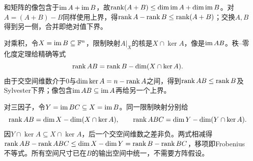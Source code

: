\label{der:8-1}
和矩阵的像包含于$\im A+\im B$，故$\rank(A+B)\le\dim\im A+\dim\im B$。对$A=(A+B)-B$同样使用上界，得$\rank A-\rank B\le\rank(A+B)$；交换$A,B$得到另一侧，合并即绝对值下界。

对乘积，令$X=\im B\subseteq\F^n$，限制映射$A|_X$的核是$X\cap\ker A$，像是$\im AB$。秩--零化度定理给精确等式
\[\rank AB=\rank B-\dim(X\cap\ker A).\]
由于交空间维数介于0与$\dim\ker A=n-\rank A$之间，得到$\rank AB\le\rank B$及Sylvester下界；像包含$\im AB\subseteq\im A$再给另一个上界。

对三因子，令$Y=\im BC\subseteq X=\im B$。同一限制映射分别给
\[\rank AB=\dim X-\dim(X\cap\ker A),\qquad
\rank ABC=\dim Y-\dim(Y\cap\ker A).\]
因$Y\cap\ker A\subseteq X\cap\ker A$，后一个交空间维数之差非负。两式相减得$\rank AB-\rank ABC\le\dim X-\dim Y=\rank B-\rank BC$，移项即Frobenius不等式。所有空间尺寸已在$B$的输出空间中统一，不需要方阵假设。
